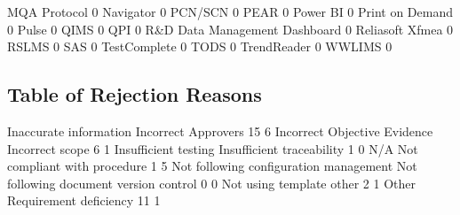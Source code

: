 \documentclass{article}
\begin{document}
\begin{Schunk}
\begin{Soutput}
  MQA Protocol                                                            0
  Navigator                                                               0
  PCN/SCN                                                                 0
  PEAR                                                                    0
  Power BI                                                                0
  Print on Demand                                                         0
  Pulse                                                                   0
  QIMS                                                                    0
  QPI                                                                     0
  R&D Data Management Dashboard                                           0
  Reliasoft Xfmea                                                         0
  RSLMS                                                                   0
  SAS                                                                     0
  TestComplete                                                            0
  TODS                                                                    0
  TrendReader                                                             0
  WWLIMS                                                                  0
\end{Soutput}
\end{Schunk}

\subsection{Table of Rejection Reasons}
\begin{Schunk}
\begin{Soutput}
                Inaccurate information                    Incorrect Approvers 
                                    15                                      6 
          Incorrect Objective Evidence                        Incorrect scope 
                                     6                                      1 
                  Insufficient testing              Insufficient traceability 
                                     1                                      0 
                                   N/A           Not compliant with procedure 
                                     1                                      5 
Not following configuration management Not following document version control 
                                     0                                      0 
                    Not using template                                  other 
                                     2                                      1 
                                 Other                 Requirement deficiency 
                                    11                                      1 
\end{Soutput}
\end{Schunk}
\end{document}

